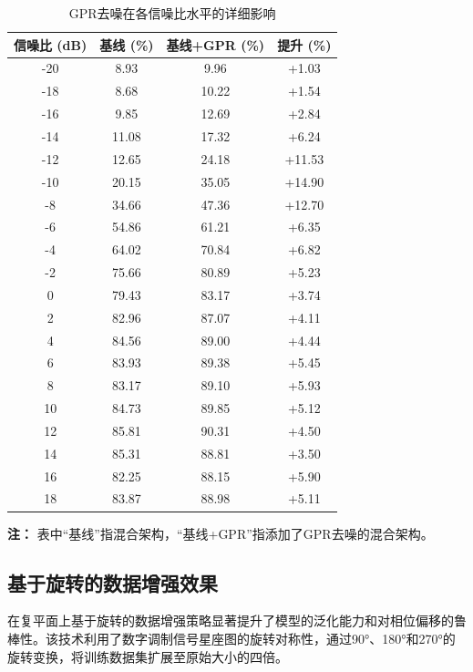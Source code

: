 \documentclass{article}
\begin{document}
\begin{table}[!htbp]
\centering
\caption{GPR去噪在各信噪比水平的详细影响}
\label{tab:gpr_detailed_snr}
\begin{threeparttable}
\begin{tabular}{@{}cccc@{}}
\toprule
信噪比 (dB) & 基线 (\%) & 基线+GPR (\%) & 提升 (\%) \\
\midrule
-20 & 8.93 & 9.96 & +1.03 \\
-18 & 8.68 & 10.22 & +1.54 \\
-16 & 9.85 & 12.69 & +2.84 \\
-14 & 11.08 & 17.32 & +6.24 \\
-12 & 12.65 & 24.18 & +11.53 \\
-10 & 20.15 & 35.05 & +14.90 \\
-8 & 34.66 & 47.36 & +12.70 \\
-6 & 54.86 & 61.21 & +6.35 \\
-4 & 64.02 & 70.84 & +6.82 \\
-2 & 75.66 & 80.89 & +5.23 \\
0 & 79.43 & 83.17 & +3.74 \\
2 & 82.96 & 87.07 & +4.11 \\
4 & 84.56 & 89.00 & +4.44 \\
6 & 83.93 & 89.38 & +5.45 \\
8 & 83.17 & 89.10 & +5.93 \\
10 & 84.73 & 89.85 & +5.12 \\
12 & 85.81 & 90.31 & +4.50 \\
14 & 85.31 & 88.81 & +3.50 \\
16 & 82.25 & 88.15 & +5.90 \\
18 & 83.87 & 88.98 & +5.11 \\
\bottomrule
\end{tabular}
\begin{tablenotes}
\item[] \textbf{注：} 表中“基线”指混合架构，“基线+GPR”指添加了GPR去噪的混合架构。
\end{tablenotes}
\end{threeparttable}
\end{table}



\subsection{基于旋转的数据增强效果}

在复平面上基于旋转的数据增强策略显著提升了模型的泛化能力和对相位偏移的鲁棒性。该技术利用了数字调制信号星座图的旋转对称性，通过90°、180°和270°的旋转变换，将训练数据集扩展至原始大小的四倍。
\end{document}
